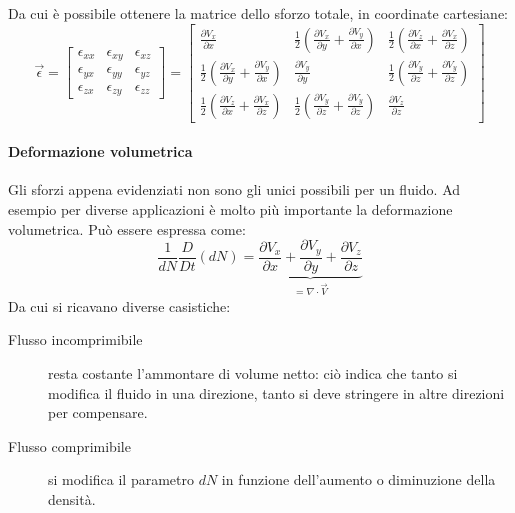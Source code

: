 Da cui è possibile ottenere la matrice dello sforzo totale, in coordinate cartesiane:
\begin{equation}
\vec{\epsilon} =%
\begin{bmatrix}
\epsilon_{xx} & \epsilon_{xy} & \epsilon_{xz}\\
\epsilon_{yx} & \epsilon_{yy} & \epsilon_{yz}\\
\epsilon_{zx} & \epsilon_{zy} & \epsilon_{zz}
\end{bmatrix}%
=%
\begin{bmatrix}
\frac{\partial V_x}{\partial x} & \frac{1}{2}\left(\frac{\partial V_x}{\partial y} + \frac{\partial V_y}{\partial x}\right) & \frac{1}{2}\left(\frac{\partial V_z}{\partial x} + \frac{\partial V_x}{\partial z}\right)\\
\frac{1}{2}\left(\frac{\partial V_x}{\partial y} + \frac{\partial V_y}{\partial x}\right) & \frac{\partial V_y}{\partial y} & \frac{1}{2}\left(\frac{\partial V_y}{\partial z} + \frac{\partial V_y}{\partial z}\right)\\
\frac{1}{2}\left(\frac{\partial V_z}{\partial x} + \frac{\partial V_x}{\partial z}\right) & \frac{1}{2}\left(\frac{\partial V_y}{\partial z} + \frac{\partial V_y}{\partial z}\right) & \frac{\partial V_z}{\partial z}
\end{bmatrix}
\end{equation}

\paragraph{Deformazione volumetrica}
Gli sforzi appena evidenziati non sono gli unici possibili per un fluido.
Ad esempio per diverse applicazioni è molto più importante la deformazione volumetrica.
Può essere espressa come:
\begin{equation}
\frac{1}{dN} \frac{D}{Dt} (dN) = \underbrace{\frac{\partial V_x}{\partial x} + \frac{\partial V_y}{\partial y} + \frac{\partial V_z}{\partial z}}_{= \nabla \cdot \vec{V}}
\end{equation}
Da cui si ricavano diverse casistiche:
\begin{description}
\item[Flusso incomprimibile] resta costante l'ammontare di volume netto: ciò indica che tanto si modifica il fluido in una direzione, tanto si deve stringere in altre direzioni per compensare.
\item[Flusso comprimibile] si modifica il parametro $dN$ in funzione dell'aumento o diminuzione della densità. 
\end{description}

